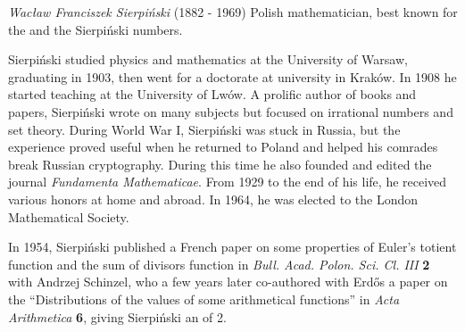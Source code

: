 \documentclass[12pt]{article}
\begin{document}
\emph{Wac\l{}aw Franciszek Sierpi\'nski} (1882 - 1969) Polish mathematician, best known for the  and the Sierpi\'nski numbers.

Sierpi\'nski studied physics and mathematics at the University of Warsaw, graduating in 1903, then went for a doctorate at university in Krak\'ow. In 1908 he started teaching at the University of Lw\'ow. A prolific author of books and papers, Sierpi\'nski wrote on many subjects but focused on irrational numbers and set theory. During World War I, Sierpi\'nski was stuck in Russia, but the experience proved useful when he returned to Poland and helped his comrades break Russian cryptography. During this time he also founded and edited the journal {\it Fundamenta Mathematicae}. From 1929 to the end of his life, he received various honors at home and abroad. In 1964, he was elected to the London Mathematical Society.

In 1954, Sierpi\'nski published a French paper on some properties of Euler's totient function and the sum of divisors function in {\it Bull. Acad. Polon. Sci. Cl. III} {\bf 2} with Andrzej Schinzel, who a few years later co-authored with Erd\H{o}s a paper on the ``Distributions of the values of some arithmetical functions'' in {\it Acta Arithmetica} {\bf 6}, giving Sierpi\'nski an  of 2.
\end{document}
